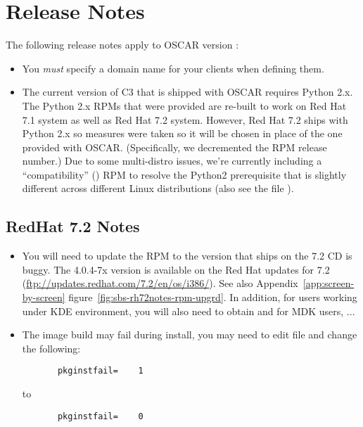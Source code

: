 %
%
%

\section{Release Notes}
\label{sec:release-notes}
The following release notes apply to OSCAR version \oscarversion:

\begin{itemize}
\item You {\em must} specify a domain name for your clients when
  defining them.
  
\item The current version of C3 that is shipped with OSCAR requires
  Python 2.x.  The Python 2.x RPMs that were provided are re-built to work on Red Hat 7.1 system as well as Red Hat 7.2 system.  However, Red Hat 7.2
  ships with Python 2.x so measures were taken so it will be chosen in
  place of the one provided with OSCAR.  (Specifically, we decremented
  the RPM release number.) Due to some multi-distro issues, we're currently including a
  ``compatibility'' () RPM to resolve the
  Python2 prerequisite that is slightly different across different
  Linux distributions (also see the file
  ).
\end{itemize}


\subsection{RedHat 7.2 Notes}
\label{subsec:rh72notes}
\begin{itemize}
\item You will need to update the  RPM to
  \- the version that ships on the 7.2 CD is
  buggy.  The 4.0.4-7x version is available on the Red Hat updates for
  7.2 (\url{ftp://updates.redhat.com/7.2/en/os/i386/}). \begchange See also Appendix~\ref{app:screen-by-screen} figure~\ref{fig:sbs-rh72notes-rpm-upgrd}. In addition, for users working under KDE environment, you will also need to obtain  and for MDK users, ... 
\endchange  
\item The image build may fail during install, you may need to edit
  file  and change
  the following:

\begin{verbatim}
       pkginstfail=    1
\end{verbatim}

  to

\begin{verbatim}
       pkginstfail=    0
\end{verbatim}
\end{itemize}

